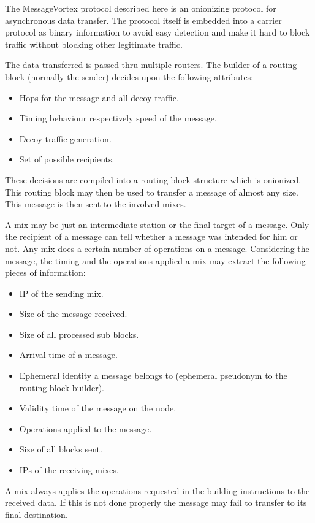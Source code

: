 The MessageVortex protocol described here is an onionizing protocol for asynchronous data transfer. The protocol itself is embedded into a carrier protocol as binary information to avoid easy detection and make it hard to block traffic without blocking other legitimate traffic.

The data transferred is passed thru multiple routers. The builder of a routing block (normally the sender) decides upon the following attributes:
\begin{itemize}
	\item Hops for the message and all decoy traffic.
	\item Timing behaviour respectively speed of the message.
	\item Decoy traffic generation.
	\item Set of possible recipients.
\end{itemize}

These decisions are compiled into a routing block structure which is onionized. This routing block may then be used to transfer a message of almost any size. This message is then sent to the involved mixes.

A mix may be just an intermediate station or the final target of a message. Only the recipient of a message can tell whether a message was intended for him or not. Any mix does a certain number of operations on a message. Considering the message, the timing and the operations applied a mix may extract the following pieces of information:

\begin{itemize}
	\item IP of the sending mix.
	\item Size of the message received.
	\item Size of all processed sub blocks.
	\item Arrival time of a message.
	\item Ephemeral identity a message belongs to (ephemeral pseudonym to the routing block builder).
	\item Validity time of the message on the node.
	\item Operations applied to the message.
	\item Size of all blocks sent.
	\item IPs of the receiving mixes.
\end{itemize}

A mix always applies the operations requested in the building instructions to the received data. If this is not done properly the message may fail to transfer to its final destination. 

